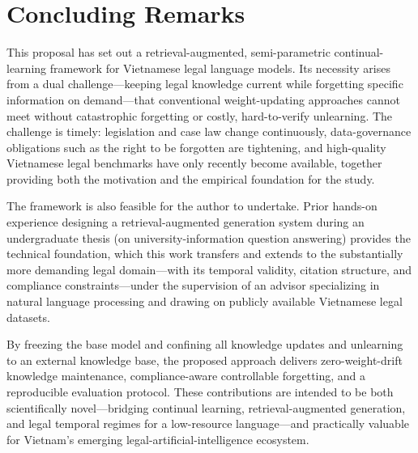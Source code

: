 \section{Concluding Remarks}

This proposal has set out a retrieval-augmented, semi-parametric continual-learning framework for Vietnamese legal language models. Its necessity arises from a dual challenge---keeping legal knowledge current while forgetting specific information on demand---that conventional weight-updating approaches cannot meet without catastrophic forgetting or costly, hard-to-verify unlearning. The challenge is timely: legislation and case law change continuously, data-governance obligations such as the right to be forgotten are tightening, and high-quality Vietnamese legal benchmarks have only recently become available, together providing both the motivation and the empirical foundation for the study.

The framework is also feasible for the author to undertake. Prior hands-on experience designing a retrieval-augmented generation system during an undergraduate thesis (on university-information question answering) provides the technical foundation, which this work transfers and extends to the substantially more demanding legal domain---with its temporal validity, citation structure, and compliance constraints---under the supervision of an advisor specializing in natural language processing and drawing on publicly available Vietnamese legal datasets.

By freezing the base model and confining all knowledge updates and unlearning to an external knowledge base, the proposed approach delivers zero-weight-drift knowledge maintenance, compliance-aware controllable forgetting, and a reproducible evaluation protocol. These contributions are intended to be both scientifically novel---bridging continual learning, retrieval-augmented generation, and legal temporal regimes for a low-resource language---and practically valuable for Vietnam's emerging legal-artificial-intelligence ecosystem.
